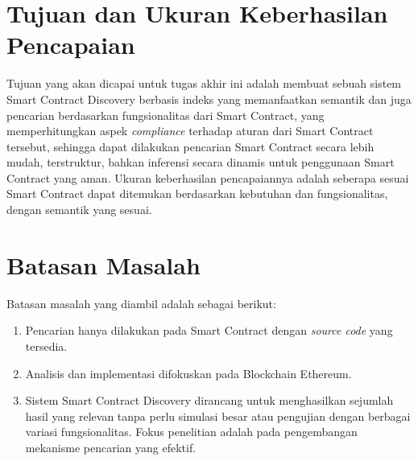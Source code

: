 
\section{Tujuan dan Ukuran Keberhasilan Pencapaian}
\label{sec:tujuan-ukuran-keberhasilan-pencapaian}


Tujuan yang akan dicapai untuk tugas akhir ini adalah membuat sebuah sistem Smart Contract Discovery berbasis indeks yang memanfaatkan semantik dan juga pencarian berdasarkan fungsionalitas dari Smart Contract, yang memperhitungkan aspek \textit{compliance} terhadap aturan dari Smart Contract tersebut, sehingga dapat dilakukan pencarian Smart Contract secara lebih mudah, terstruktur, bahkan inferensi secara dinamis untuk penggunaan Smart Contract yang aman. Ukuran keberhasilan pencapaiannya adalah seberapa sesuai Smart Contract dapat ditemukan berdasarkan kebutuhan dan fungsionalitas, dengan semantik yang sesuai.

\section{Batasan Masalah}
\label{sec:batasan-masalah}


Batasan masalah yang diambil adalah sebagai berikut:

\begin{enumerate}
  \item Pencarian hanya dilakukan pada Smart Contract dengan \textit{source code} yang tersedia.
  \item Analisis dan implementasi difokuskan pada Blockchain Ethereum.
  \item Sistem Smart Contract Discovery dirancang untuk menghasilkan sejumlah hasil yang relevan tanpa perlu simulasi besar atau pengujian dengan berbagai variasi fungsionalitas. Fokus penelitian adalah pada pengembangan mekanisme pencarian yang efektif.
\end{enumerate}


